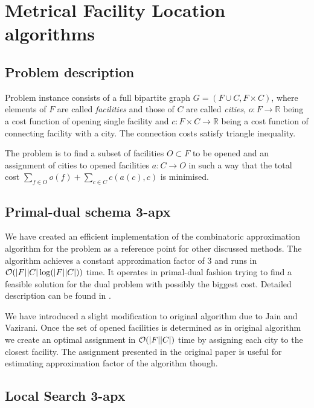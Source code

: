 \chapter{Metrical Facility Location algorithms}

\section{Problem description}

Problem instance consists of a full bipartite graph $G = (F \cup C, F \times
C)$, where elements of $F$ are called \emph{facilities} and those of $C$ are
called \emph{cities}, $o : F \to \mathbb{R}$ being a cost function of opening
single facility and $c : F \times C \to \mathbb{R}$ being a cost function of
connecting facility with a city. The connection costs satisfy triangle
inequality.

The problem is to find a subset of facilities $O \subset F$ to be opened and an
assignment of cities to opened facilities $a : C \to O$ in such a way that the
total cost $\sum_{f \in O} o(f) + \sum_{c \in C} c(a(c), c)$ is minimised.

\section{Primal-dual schema 3-apx}
We have created an efficient implementation of the combinatoric approximation
algorithm for the problem as a reference point for other discussed methods. The
algorithm achieves a constant approximation factor of 3 and runs in $\mathcal{O}(|F||C|
\log(|F||C|))$ time. It operates in primal-dual fashion trying to find a feasible
solution for the dual problem with possibly the biggest cost. Detailed description
can be found in \cite{Vazirani}.

We have introduced a slight modification to original algorithm due to Jain and
Vazirani. Once the set of opened facilities is determined as in original
algorithm we create an optimal assignment in $\mathcal{O}(|F||C|)$ time by assigning each
city to the closest facility. The assignment presented in the original paper is
useful for estimating approximation factor of the algorithm though.

\section{Local Search 3-apx}

